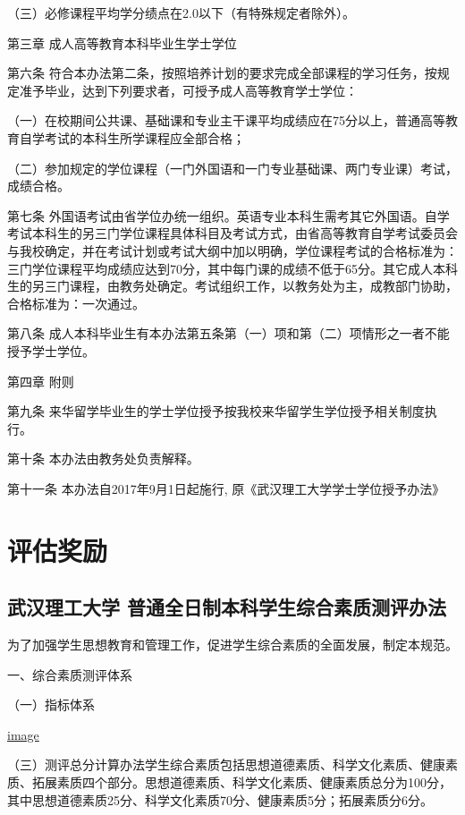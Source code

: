 \documentclass[UTF8,12pt,a4paper]{report}
\begin{document}
（三）必修课程平均学分绩点在2.0以下（有特殊规定者除外）。　　



第三章 成人高等教育本科毕业生学士学位

第六条  符合本办法第二条，按照培养计划的要求完成全部课程的学习任务，按规定准予毕业，达到下列要求者，可授予成人高等教育学士学位：

（一）在校期间公共课、基础课和专业主干课平均成绩应在75分以上，普通高等教育自学考试的本科生所学课程应全部合格；

（二）参加规定的学位课程（一门外国语和一门专业基础课、两门专业课）考试，成绩合格。

第七条  外国语考试由省学位办统一组织。英语专业本科生需考其它外国语。自学考试本科生的另三门学位课程具体科目及考试方式，由省高等教育自学考试委员会与我校确定，并在考试计划或考试大纲中加以明确，学位课程考试的合格标准为：三门学位课程平均成绩应达到70分，其中每门课的成绩不低于65分。其它成人本科生的另三门课程，由教务处确定。考试组织工作，以教务处为主，成教部门协助，合格标准为：一次通过。

第八条  成人本科毕业生有本办法第五条第（一）项和第（二）项情形之一者不能授予学士学位。



第四章 附则

第九条  来华留学毕业生的学士学位授予按我校来华留学生学位授予相关制度执行。

第十条  本办法由教务处负责解释。

第十一条  本办法自2017年9月1日起施行, 原《武汉理工大学学士学位授予办法》

\part{评估奖励}
\chapter{武汉理工大学 普通全日制本科学生综合素质测评办法}
为了加强学生思想教育和管理工作，促进学生综合素质的全面发展，制定本规范。

一、综合素质测评体系

（一）指标体系

\href{http://img01.fs.yiban.cn/out/thumb_550x0/aHR0cDovL3lmczAxLmZzLnlpYmFuLmNuL3dlYi83NTg4OTE0L3VwbG9hZC8xNTA0NzY5Mjc4NTE2NTc3LnBuZw==}{image}

（三）测评总分计算办法学生综合素质包括思想道德素质、科学文化素质、健康素质、拓展素质四个部分。思想道德素质、科学文化素质、健康素质总分为100分，其中思想道德素质25分、科学文化素质70分、健康素质5分；拓展素质分6分。
\end{document}
